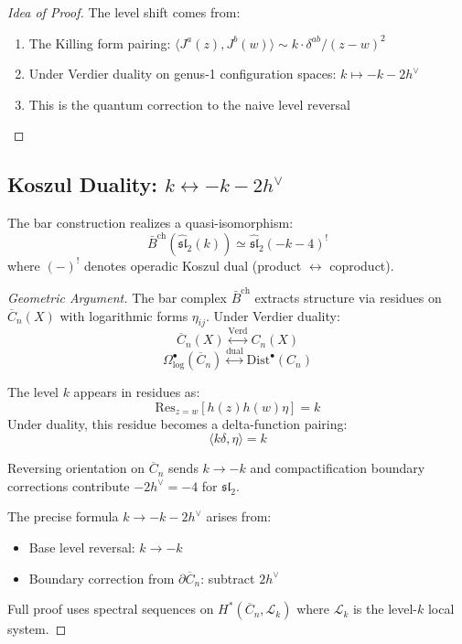 \begin{proof}[Idea of Proof]
The level shift comes from:
\begin{enumerate}
\item The Killing form pairing: $\langle J^a(z), J^b(w) \rangle \sim k \cdot \delta^{ab}/(z-w)^2$
\item Under Verdier duality on genus-1 configuration spaces: $k \mapsto -k - 2h^\vee$
\item This is the quantum correction to the naive level reversal
\end{enumerate}
\end{proof}

\subsection{Koszul Duality: $k \leftrightarrow -k-2h^\vee$}

\begin{theorem}
\label{thm:sl2-koszul-level}
The bar construction realizes a quasi-isomorphism:
$$\bar{B}^{\text{ch}}(\widehat{\mathfrak{sl}}_2(k)) \simeq \widehat{\mathfrak{sl}}_2(-k-4)^! $$
where $(-)^!$ denotes operadic Koszul dual (product $\leftrightarrow$ coproduct).
\end{theorem}

\begin{proof}[Geometric Argument]
The bar complex $\bar{B}^{\text{ch}}$ extracts structure via residues on $\overline{C}_n(X)$ with logarithmic forms $\eta_{ij}$. Under Verdier duality:
$$\overline{C}_n(X) \overset{\text{Verd}}{\longleftrightarrow} C_n(X)$$
$$\Omega^{\bullet}_{\log}(\overline{C}_n) \overset{\text{dual}}{\longleftrightarrow} \text{Dist}^{\bullet}(C_n)$$

The level $k$ appears in residues as:
$$\text{Res}_{z=w}[h(z)h(w) \eta] = k$$
Under duality, this residue becomes a delta-function pairing:
$$\langle k \delta, \eta \rangle = k$$

Reversing orientation on $\overline{C}_n$ sends $k \to -k$ and compactification boundary corrections contribute $-2h^\vee = -4$ for $\mathfrak{sl}_2$.

The precise formula $k \to -k-2h^\vee$ arises from:
\begin{itemize}
\item Base level reversal: $k \to -k$
\item Boundary correction from $\partial\overline{C}_n$: subtract $2h^\vee$
\end{itemize}
Full proof uses spectral sequences on $H^*(\overline{C}_n, \mathcal{L}_k)$ where $\mathcal{L}_k$ is the level-$k$ local system.
\end{proof}

